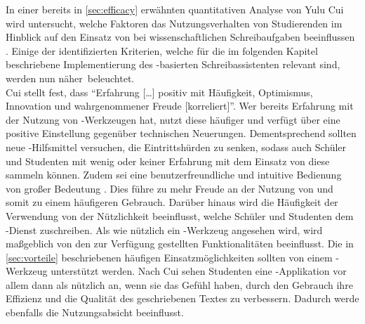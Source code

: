 \documentclass[../main.tex]{subfiles}
\begin{document}
In einer bereits in \autoref{sec:efficacy} erwähnten quantitativen Analyse von Yulu Cui wird untersucht, welche Faktoren das Nutzungsverhalten von Studierenden im Hinblick auf den 
Einsatz von   bei wissenschaftlichen Schreibaufgaben beeinflussen \cite{influencingUsingAi}. Einige der identifizierten Kriterien, welche für die im folgenden Kapitel 
beschriebene Implementierung des -basierten Schreibassistenten relevant sind, werden nun \mbox{näher beleuchtet.} \\ 
Cui stellt fest, dass "`Erfahrung […] positiv mit Häufigkeit, Optimismus, Innovation und wahrgenommener Freude [korreliert]"'\cite[6]{influencingUsingAi}. Wer bereits 
Erfahrung mit der Nutzung von -Werkzeugen hat, nutzt diese häufiger und verfügt über eine positive Einstellung gegenüber technischen Neuerungen. Dementsprechend 
sollten neue -Hilfsmittel versuchen, die Eintrittshürden zu senken, sodass auch Schüler und Studenten mit wenig oder keiner Erfahrung mit dem Einsatz von  diese 
sammeln können. Zudem sei eine benutzerfreundliche und intuitive Bedienung von großer Bedeutung \cite[6]{influencingUsingAi}. Dies führe zu mehr Freude an der Nutzung 
von  und somit zu einem häufigeren Gebrauch. Darüber hinaus wird die Häufigkeit der Verwendung von der Nützlichkeit beeinflusst, welche Schüler und Studenten 
dem -Dienst zuschreiben. Als wie nützlich ein -Werkzeug angesehen wird, wird maßgeblich von den zur Verfügung gestellten Funktionalitäten beeinflusst. Die in 
\autoref{sec:vorteile} beschriebenen häufigen Einsatzmöglichkeiten sollten von einem -Werkzeug unterstützt werden. Nach Cui sehen Studenten eine -Applikation vor allem dann 
als nützlich an, wenn sie das Gefühl haben, durch den Gebrauch ihre Effizienz und die Qualität des geschriebenen Textes zu verbessern. Dadurch werde ebenfalls die 
Nutzungsabsicht beeinflusst\cite[7]{influencingUsingAi}. \\

\end{document}
